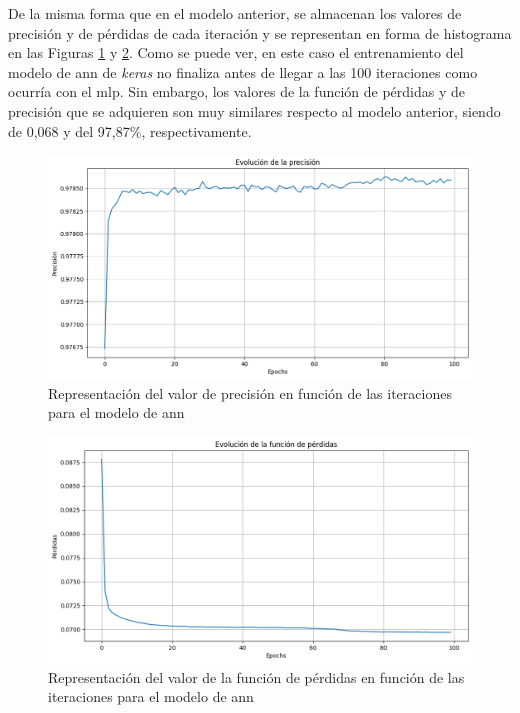 \vspace{3mm}

De la misma forma que en el modelo anterior, se almacenan los valores de precisión y de pérdidas de cada iteración y se representan en forma de histograma en las Figuras \ref{fig:3annacc} y \ref{fig:3annloss}. Como se puede ver, en este caso el entrenamiento del modelo de \gls{ann} de \textit{keras} no finaliza antes de llegar a las 100 iteraciones como ocurría con el \gls{mlp}. Sin embargo, los valores de la función de pérdidas y de precisión que se adquieren son muy similares respecto al modelo anterior, siendo de 0,068 y del 97,87\%, respectivamente. 

\vspace{3mm}

\begin{figure}[H]
  \centering
  \includegraphics[width=1\textwidth]{img/desarrollo/ann/3annacc.png}
  \caption{Representación del valor de precisión en función de las iteraciones para el modelo de \acrshort{ann}}
  \label{fig:3annacc}
\end{figure}

\begin{figure}[H]
  \centering
  \includegraphics[width=1\textwidth]{img/desarrollo/ann/3annloss.png}
  \caption{Representación del valor de la función de pérdidas en función de las iteraciones para el modelo de \acrshort{ann}}
  \label{fig:3annloss}
\end{figure}

